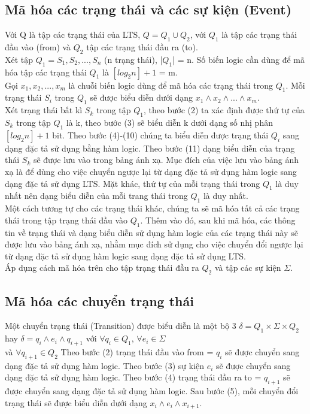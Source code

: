 \documentclass{article}
\begin{document}
\begin{flushleft}
		\subsection{Mã hóa các trạng thái và các sự kiện (Event)}
		Với Q là tập các trạng thái của LTS, $Q = Q_1 \cup Q_2$, với $Q_1$ là tập các trạng thái đầu vào (from) và $Q_2$ tập các trạng thái đầu ra (to).\\
		Xét tập $Q_{1} = S_{1}, S_{2}, ..., S_{n}$ (n trạng thái), |$Q_{1}$| = n. Số biến logic cần dùng để mã hóa tập các trạng thái $Q_{1}$ là $[log_{2}n] + 1$ = m.\\
		Gọi $x_{1}, x_{2}, ..., x_{m}$ là chuỗi biến logic dùng để mã hóa các trạng thái trong $Q_{1}$. Mỗi trạng thái $S_{i}$ trong $Q_{1}$ sẽ được biểu diễn dưới dạng $x_{1}\land x_{2}\land...\land x_{m}$.\\
		Xét trạng thái bất kì $S_{k}$ trong tập $Q_{1}$, theo bước (2) ta xác định được thứ tự của $S_{k}$ trong tập $Q_{1}$ là k, theo bước (3) sẽ biểu diễn k dưới dạng số nhị phân $[log_{2}n] + 1$ bit. Theo bước (4)-(10) chúng ta biểu diễn được trạng thái $Q_{i}$ sang dạng đặc tả sử dụng bằng hàm logic. Theo bước (11) dạng biểu diễn của trạng thái $S_k$ sẽ được lưu vào trong bảng ánh xạ. Mục đích của việc lưu vào bảng ánh xạ là để dùng cho việc chuyển ngược lại từ dạng đặc tả sử dụng hàm logic sang dạng đặc tả sử dụng LTS. Mặt khác, thứ tự của mỗi trạng thái trong $Q_1$ là duy nhất nên dạng biểu diễn của mỗi trang thái trong $Q_1$ là duy nhất.\\
		Một cách tương tự cho các trạng thái khác, chúng ta sẽ mã hóa tất cả các trạng thái trong tập trạng thái đầu vào $Q_{1}$. Thêm vào đó, sau khi mã hóa, các thông tin về trạng thái và dạng biểu diễn sử dụng hàm logic của các trạng thái này sẽ được lưu vào bảng ánh xạ, nhằm mục đích sử dụng cho việc chuyển đổi ngược lại từ dạng đặc tả sử dụng hàm logic sang dạng đặc tả sử dụng LTS.\\
		Áp dụng cách mã hóa trên cho tập trạng thái đầu ra $Q_{2}$ và tập các sự kiện $\Sigma$.
		\subsection{Mã hóa các chuyển trạng thái}
		Một chuyển trạng thái (Transition) được biểu diễn là một bộ 3 $\delta = Q_{1} \times \Sigma \times Q_{2}$ hay $\delta = q_{i} \land e_i \land q_{i+1}$ với $\forall q_{i} \in Q_{1}$, $\forall e_{i} \in \Sigma$\\ và $\forall q_{i+1} \in Q_{2}$
		Theo bước (2) trạng thái đầu vào from = $q_{i}$ sẽ được chuyển sang dạng đặc tả sử dụng hàm logic. Theo bước (3) sự kiện $e_i$ sẽ được chuyển sang dạng đặc tả sử dụng hàm logic. Theo bước (4) trạng thái đầu ra to = $q_{i+1}$ sẽ được chuyển sang dạng đặc tả sử dụng hàm logic. Sau bước (5), mỗi chuyển đổi trạng thái sẽ được biểu diễn dưới dạng $x_{i} \land e_i \land x_{i+1}$.\\

\end{flushleft}
\end{document}
